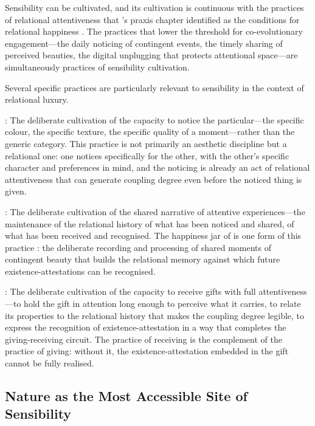 \noindent
Sensibility can be cultivated, and its cultivation is continuous with the practices of relational attentiveness that 's praxis chapter identified as the conditions for relational happiness \parencite{paperxiv}. The practices that lower the threshold for co-evolutionary engagement---the daily noticing of contingent events, the timely sharing of perceived beauties, the digital unplugging that protects attentional space---are simultaneously practices of sensibility cultivation.

Several specific practices are particularly relevant to sensibility in the context of relational luxury.

: The deliberate cultivation of the capacity to notice the particular---the specific colour, the specific texture, the specific quality of a moment---rather than the generic category. This practice is not primarily an aesthetic discipline but a relational one: one notices specifically for the other, with the other's specific character and preferences in mind, and the noticing is already an act of relational attentiveness that can generate coupling degree even before the noticed thing is given.

: The deliberate cultivation of the shared narrative of attentive experiences---the maintenance of the relational history of what has been noticed and shared, of what has been received and recognised. The happiness jar of  is one form of this practice \parencite{paperxv}: the deliberate recording and processing of shared moments of contingent beauty that builds the relational memory against which future existence-attestations can be recognised.

: The deliberate cultivation of the capacity to receive gifts with full attentiveness---to hold the gift in attention long enough to perceive what it carries, to relate its properties to the relational history that makes the coupling degree legible, to express the recognition of existence-attestation in a way that completes the giving-receiving circuit. The practice of receiving is the complement of the practice of giving: without it, the existence-attestation embedded in the gift cannot be fully realised.

\subsection{Nature as the Most Accessible Site of Sensibility}
\label{p16:subsec:nature}


